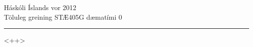 \documentclass[12pt,a4paper]{article}
\begin{document}
\noindent Háskóli Íslands \hfill vor 2012\\
Töluleg greining STÆ405G \hfill dæmatími 0
\rule[8pt]{\textwidth}{1pt}
<++>
\end{document}
